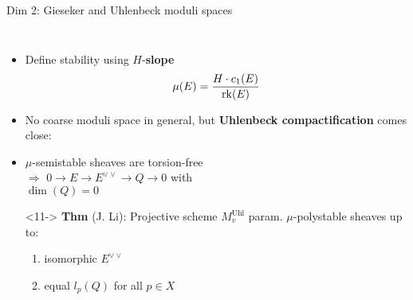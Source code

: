 \documentclass[8pt,handout]{beamer} %
\begin{document}
\begin{frame}[fragile]{Dim 2: Gieseker and Uhlenbeck moduli spaces}
\begin{columns}[t]
        \begin{itemize}
            \item<8-> Define stability using $H$-\textbf{slope}
            \[ \mu(E) = \frac{H \cdot c_1(E)}{\operatorname{\mathrm{rk}}(E)} \]
            \item<9-> No coarse moduli space in general, but \textbf{Uhlenbeck compactification} comes close:
            \item<10-> $\mu$-semistable sheaves are torsion-free \\
            $\Rightarrow$ \quad $0 \to E \to E^{\vee\vee} \to Q \to 0$ \; with \\ \qquad \; $\dim(Q) = 0$
            \item[]
            \item[]<11-> \textbf{Thm} (J. Li): Projective scheme $M^{\text{Uhl}}_v$ param. $\mu$-polystable sheaves up to:
            \begin{enumerate}
                \item<12-> isomorphic $E^{\vee\vee}$ 
                \item<13-> equal $l_p(Q)$ for all $p \in X$
            \end{enumerate}
        \end{itemize}
    \end{columns}
\end{frame}
\end{document}
